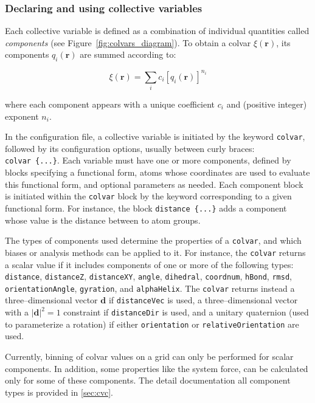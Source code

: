 \subsubsection{Declaring and using collective variables}
\label{sec:colvar}

Each collective variable is defined as a combination of
individual quantities called \emph{components}
(see Figure~\ref{fig:colvars_diagram}). To obtain a colvar $\xi(\mathbf{r})$,
its components $q_i(\mathbf{r})$ are summed according to:

\begin{equation}
  \label{eq:colvar_combination}
  \xi(\mathbf{r}) = \sum_i c_i [q_i(\mathbf{r})]^{n_i}
\end{equation}

where each component appears with a unique coefficient $c_i$
and (positive integer) exponent $n_i$.

In the configuration file, a collective variable is initiated
by the keyword \texttt{colvar},
followed by its configuration options, usually between curly braces:
\texttt{colvar~\{...\}}. Each variable must
have one or more components, defined by blocks specifying a
functional form, atoms whose coordinates are used to evaluate
this functional form, and optional parameters as needed. Each
component block is initiated within the \texttt{colvar} block by the
keyword corresponding to a given functional form.  For instance, the
block \texttt{distance \{...\}} adds a component whose value is
the distance between to atom groups.

The types of components used determine the properties of a
\texttt{colvar}, and which biases or analysis methods can be applied
to it.  For instance, the \texttt{colvar} returns a scalar value if it
includes components of one or more of the following types:
\texttt{distance}, \texttt{distanceZ}, \texttt{distanceXY},
\texttt{angle}, \texttt{dihedral}, \texttt{coordnum}, \texttt{hBond},
\texttt{rmsd}, \texttt{orientationAngle}, \texttt{gyration}, and
\texttt{alphaHelix}.  The \texttt{colvar} returns instead a
three--dimensional vector $\mathbf{d}$ if \texttt{distanceVec} is
used, a three--dimensional vector with a $|\mathbf{d}|^2 = 1$
constraint if \texttt{distanceDir} is used, and a unitary quaternion
(used to parameterize a rotation) if either \texttt{orientation} or
\texttt{relativeOrientation} are used.

Currently, binning of colvar values on a grid can only be performed
for scalar components.  In addition, some properties like the system
force, can be calculated only for some of these components.  The
detail documentation all component types is provided in \ref{sec:cvc}.

